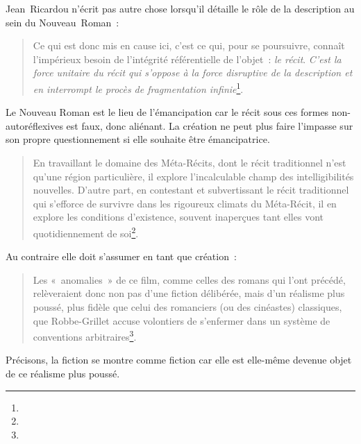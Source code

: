 Jean~Ricardou n'écrit pas autre chose lorsqu'il détaille le rôle de la description au sein du Nouveau~Roman~:
\begin{quote}
    Ce qui est donc mis en cause ici, c'est ce qui, pour se poursuivre, connaît l'impérieux besoin de l'intégrité référentielle de l'objet~: \textit{le récit}. \textit{C'est la force unitaire du récit qui s'oppose à la force disruptive de la description et en interrompt le procès de fragmentation infinie}\footnote{}.
\end{quote}
Le Nouveau Roman est le lieu de l'émancipation car le récit sous ces formes non-autoréflexives est faux, donc aliénant. La création ne peut plus faire l'impasse sur son propre questionnement si elle souhaite être émancipatrice.
\begin{quote}
    En travaillant le domaine des Méta-Récits, dont le récit traditionnel n'est qu'une région particulière,  il explore l'incalculable champ des intelligibilités nouvelles. D'autre part, en contestant et subvertissant le récit traditionnel qui s'efforce de survivre dans les rigoureux climats du Méta-Récit, il en explore les conditions d'existence, souvent inaperçues tant elles vont quotidiennement de soi\footnote{}.
\end{quote}
Au contraire elle doit s'assumer en tant que création~:
\begin{quote}
    Les «~anomalies~» de ce film, comme celles des romans qui l'ont précédé, relèveraient donc non pas d'une fiction délibérée, mais d'un réalisme plus poussé, plus fidèle que celui des romanciers (ou des cinéastes) classiques, que Robbe-Grillet accuse volontiers de s'enfermer dans un système de conventions arbitraires\footnote{}.
\end{quote}

Précisons, la fiction se montre comme fiction car elle est elle-même devenue objet de ce réalisme plus poussé. 

